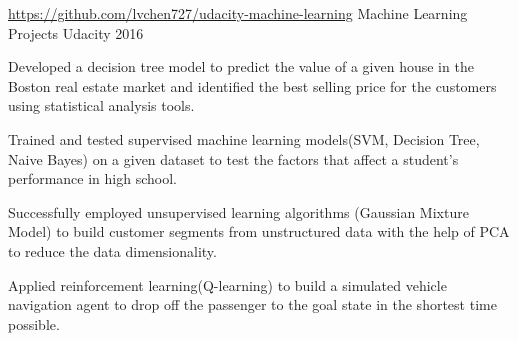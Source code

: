 

\begin{cventries}

  \cventry
  	{\url{https://github.com/lvchen727/udacity-machine-learning}} %
    {Machine Learning Projects}%
    {Udacity} %
    {2016} %
    {
      \begin{cvitems} %
        \item{Developed a decision tree model to predict the value of a given house in the Boston real estate market and identified the best selling price for the customers using statistical analysis tools.}
        \item {Trained and tested supervised machine learning models(SVM, Decision Tree, Naive Bayes) on a given dataset to test the factors that affect a student's performance in high school. }
        \item {Successfully employed unsupervised learning algorithms (Gaussian Mixture Model) to build customer segments from unstructured data with the help of PCA to reduce the data dimensionality.}
        \item {Applied reinforcement learning(Q-learning) to build a simulated vehicle navigation agent to drop off the passenger to the goal state in the shortest time possible. }
      \end{cvitems}
    }


\end{cventries}
